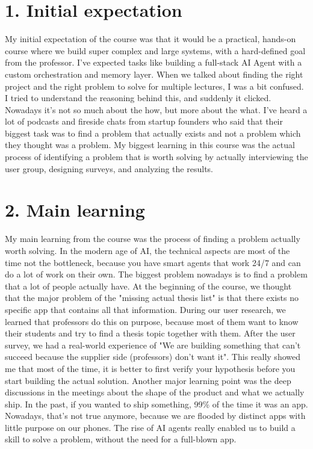 \documentclass[11pt,a4paper]{article}
\begin{document}
    

\section*{1. Initial expectation}

My initial expectation of the course was that it would be a practical, hands-on course where we build super complex and large systems, with a hard-defined goal from the professor. 
I've expected tasks like building a full-stack AI Agent with a custom orchestration and memory layer. When we talked about finding the right project and the right problem to solve for multiple lectures, I was a bit confused. I tried to understand the reasoning behind this, and suddenly it clicked. Nowadays it's not so much about the
how, but more about the what. I've heard a lot of podcasts and fireside chats from startup founders who said that their biggest task was to find a problem that actually exists and not a problem which they thought was a problem. 
My biggest learning in this course was the actual process of identifying a problem that is worth solving by actually interviewing the user group, designing surveys, and analyzing the results.  

\section*{2. Main learning}
My main learning from the course was the process of finding a problem actually worth solving. In the modern age of AI, the technical aspects are most of the time not the bottleneck, because you have smart
agents that work 24/7 and can do a lot of work on their own. The biggest problem nowadays is to find a problem that a lot of people actually have. At the beginning of the course, we thought that the major problem of the "missing actual thesis list" is that there exists no specific app that contains all that information. 
During our user research, we learned that professors do this on purpose, because most
of them want to know their students and try to find a thesis topic together with them. After the user survey, we had a real-world experience of "We are building something that can't succeed because the supplier side (professors) don't want it". This really showed me that most of the time, it is better to first verify your
hypothesis before you start building the actual solution. Another major learning point was the deep discussions in the meetings about the shape of the product and what we actually ship. In the past, if you wanted to ship something, 99\% of the time it was an app. Nowadays, that's not true anymore, because we are flooded 
by distinct apps with little purpose on our phones. The rise of AI agents really enabled us to build a skill to solve a problem, without the need for a full-blown app.
\end{document}
